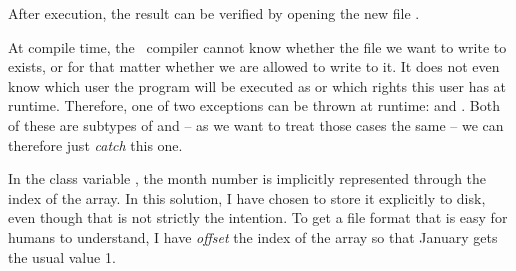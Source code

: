 \inputminted{csharp}{\context/answer/Months.cs}

After execution, the result can be verified by opening the new file .

At compile time, the \csharp\ compiler cannot know whether the file we want to write to exists, or for that matter whether we are allowed to write to it. It does not even know which user the program will be executed as or which rights this user has at runtime. Therefore, one of two exceptions can be thrown at runtime:  and . Both of these are subtypes of  and -- as we want to treat those cases the same -- we can therefore just \textsl{catch} this one.

In the class variable , the month number is implicitly represented through the index of the array. In this solution, I have chosen to store it explicitly to disk, even though that is not strictly the intention. To get a file format that is easy for humans to understand, I have \textsl{offset} the index of the array so that January gets the usual value 1.
